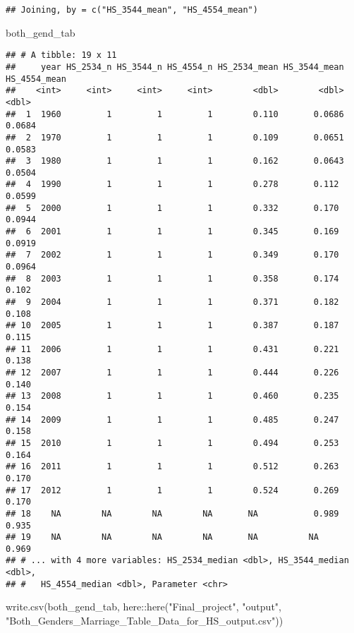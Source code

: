 \documentclass[
]{article}
\newenvironment{Shaded}{\begin{snugshade}}{\end{snugshade}}
\newcommand{\FunctionTok}[1]{\textcolor[rgb]{0.00,0.00,0.00}{#1}}
\newcommand{\NormalTok}[1]{#1}
\newcommand{\SpecialCharTok}[1]{\textcolor[rgb]{0.00,0.00,0.00}{#1}}
\newcommand{\StringTok}[1]{\textcolor[rgb]{0.31,0.60,0.02}{#1}}
\begin{document}
\begin{verbatim}
## Joining, by = c("HS_3544_mean", "HS_4554_mean")
\end{verbatim}

\begin{Shaded}
\begin{Highlighting}[]
\NormalTok{both\_gend\_tab}
\end{Highlighting}
\end{Shaded}

\begin{verbatim}
## # A tibble: 19 x 11
##     year HS_2534_n HS_3544_n HS_4554_n HS_2534_mean HS_3544_mean HS_4554_mean
##    <int>     <int>     <int>     <int>        <dbl>        <dbl>        <dbl>
##  1  1960         1         1         1        0.110       0.0686       0.0684
##  2  1970         1         1         1        0.109       0.0651       0.0583
##  3  1980         1         1         1        0.162       0.0643       0.0504
##  4  1990         1         1         1        0.278       0.112        0.0599
##  5  2000         1         1         1        0.332       0.170        0.0944
##  6  2001         1         1         1        0.345       0.169        0.0919
##  7  2002         1         1         1        0.349       0.170        0.0964
##  8  2003         1         1         1        0.358       0.174        0.102 
##  9  2004         1         1         1        0.371       0.182        0.108 
## 10  2005         1         1         1        0.387       0.187        0.115 
## 11  2006         1         1         1        0.431       0.221        0.138 
## 12  2007         1         1         1        0.444       0.226        0.140 
## 13  2008         1         1         1        0.460       0.235        0.154 
## 14  2009         1         1         1        0.485       0.247        0.158 
## 15  2010         1         1         1        0.494       0.253        0.164 
## 16  2011         1         1         1        0.512       0.263        0.170 
## 17  2012         1         1         1        0.524       0.269        0.170 
## 18    NA        NA        NA        NA       NA           0.989        0.935 
## 19    NA        NA        NA        NA       NA          NA            0.969 
## # ... with 4 more variables: HS_2534_median <dbl>, HS_3544_median <dbl>,
## #   HS_4554_median <dbl>, Parameter <chr>
\end{verbatim}

\begin{Shaded}
\begin{Highlighting}[]
\FunctionTok{write.csv}\NormalTok{(both\_gend\_tab,}
\NormalTok{          here}\SpecialCharTok{::}\FunctionTok{here}\NormalTok{(}\StringTok{"Final\_project"}\NormalTok{, }\StringTok{"output"}\NormalTok{, }\StringTok{"Both\_Genders\_Marriage\_Table\_Data\_for\_HS\_output.csv"}\NormalTok{))}
\end{Highlighting}
\end{Shaded}
\end{document}
